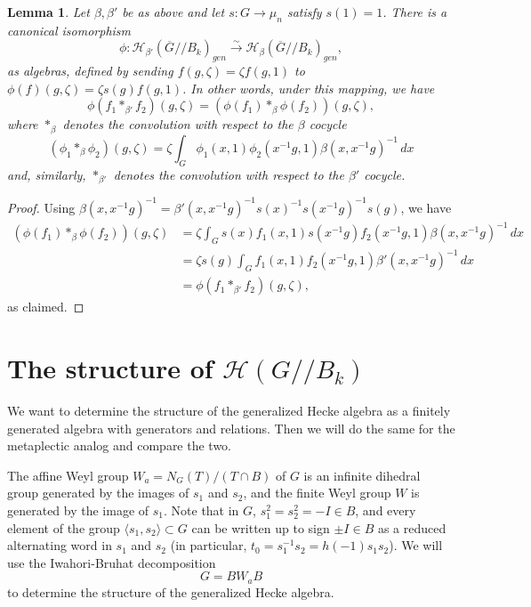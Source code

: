 \documentclass[12pt,letterpaper,reqno]{amsart}
\let\cal\mathcal
\newtheorem{lemma}[theorem]{Lemma}
\theoremstyle{definition}
\theoremstyle{remark}
\numberwithin{equation}{section}
\begin{document}
\begin{lemma}
\label{lemma:isomorphic}
Let $\beta,\beta'$ be as above and let $s:G\rightarrow \mu_n$ satisfy
$s(1)=1$. There is a canonical isomorphism
\[
\phi:{\cal H}_{\beta'}(\overline{G}//B_k)_{gen}
\stackrel{\sim}{\longrightarrow}
{\cal H}_{\beta}(\overline{G}//B_k)_{gen},
\]
as algebras, defined by sending $f(g,\zeta)=\zeta f(g,1)$ to
$\phi(f)(g,\zeta)=\zeta s(g) f(g,1)$. In other words, under this mapping, we
have
\[
\phi(f_1*_{\beta'} f_2)(g,\zeta)
=(\phi(f_1)*_{\beta}\phi(f_2))(g,\zeta),
\]
where $*_\beta$ denotes the convolution with respect to the $\beta$ cocycle
\[
(\phi_1*_\beta \phi_2)(g,\zeta)
=\zeta \int_{G}\phi_1(x,1)\phi_2(x^{-1}g,1)
\beta(x,x^{-1}g)^{-1}\,dx
\]
and, similarly, $*_{\beta'}$ denotes the convolution with respect to the
$\beta'$ cocycle.
\end{lemma}

\begin{proof}
Using $\beta(x,x^{-1}g)^{-1}=\beta'(x,x^{-1}g)^{-1}s(x)^{-1}s(x^{-1}g)^{-1}s(g)$,
we have
\[
\begin{aligned}
(\phi(f_1)*_\beta \phi(f_2))(g,\zeta)
&=\zeta \int_G s(x)f_1(x,1)s(x^{-1}g)f_2(x^{-1}g,1)
\beta(x,x^{-1}g)^{-1}\,dx\\
&=\zeta s(g)\int_G f_1(x,1)f_2(x^{-1}g,1)\beta'(x,x^{-1}g)^{-1}\,dx\\
&=\phi(f_1*_{\beta'}f_2)(g,\zeta),
\end{aligned}
\]
as claimed.
\end{proof}

\section{The structure of ${\cal H}(G//B_k)$}
\label{section:sl2}

We want to determine the structure of the generalized Hecke algebra as a
finitely generated algebra with generators and relations. Then we will do the
same for the metaplectic analog and compare the two.

The affine Weyl group $W_a = N_G(T)/(T\cap B)$ of $G$ is an infinite dihedral
group generated by the images of $s_1$ and $s_2$, and the finite Weyl group
$W$ is generated by the image of $s_1$. Note that in $G$, $s_1^2=s_2^2=-I\in B$,
and every element of the group $\langle s_1,s_2\rangle \subset G$ can be
written up to sign $\pm I\in B$ as a reduced alternating word in $s_1$ and
$s_2$ (in particular, $t_0=s_1^{-1}s_2=h(-1)s_1s_2$). We will use the
Iwahori-Bruhat decomposition
\[
G=BW_aB
\]
to determine the structure of the generalized Hecke algebra.
\end{document}
